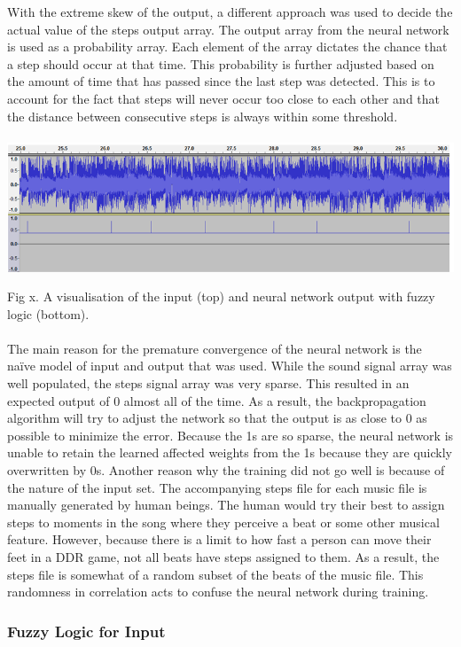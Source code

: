 With the extreme skew of the output, a different approach was used to decide the actual value of the steps output array. The output array from the neural network is used as a probability array. Each element of the array dictates the chance that a step should occur at that time. This probability is further adjusted based on the amount of time that has passed since the last step was detected. This is to account for the fact that steps will never occur too close to each other and that the distance between consecutive steps is always within some threshold.\\\\

\includegraphics[scale=0.55]{signal_2.png}

Fig x. A visualisation of the input (top) and neural network output with fuzzy logic (bottom).
\\\\
The main reason for the premature convergence of the neural network is the naïve model of input and output that was used. While the sound signal array was well populated, the steps signal array was very sparse. This resulted in an expected output of 0 almost all of the time. As a result, the backpropagation algorithm will try to adjust the network so that the output is as close to 0 as possible to minimize the error. Because the 1s are so sparse, the neural network is unable to retain the learned affected weights from the 1s because they are quickly overwritten by 0s.
Another reason why the training did not go well is because of the nature of the input set. The accompanying steps file for each music file is manually generated by human beings. The human would try their best to assign steps to moments in the song where they perceive a beat or some other musical feature. However, because there is a limit to how fast a person can move their feet in a DDR game, not all beats have steps assigned to them. As a result, the steps file is somewhat of a random subset of the beats of the music file. This randomness in correlation acts to confuse the neural network during training.

\subsubsection{Fuzzy Logic for Input}


